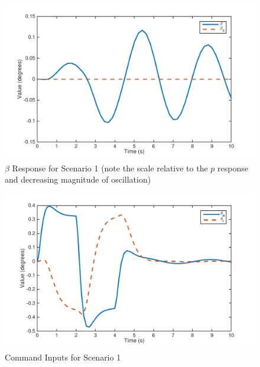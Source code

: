 \documentclass[11pt]{article}
\begin{document}
\begin{figure}[h!]
\begin{center}
\includegraphics[height=.32\textheight]{figures/beta2}
\caption{$\beta$ Response for Scenario 1 (note the scale relative to the $p$ response and decreasing magnitude of oscillation)}
\end{center}
\end{figure}

\begin{figure}[h!]
\begin{center}
\includegraphics[height=.4\textheight]{figures/inputs2}
\caption{Command Inputs for Scenario 1}
\end{center}
\end{figure}
\end{document}
